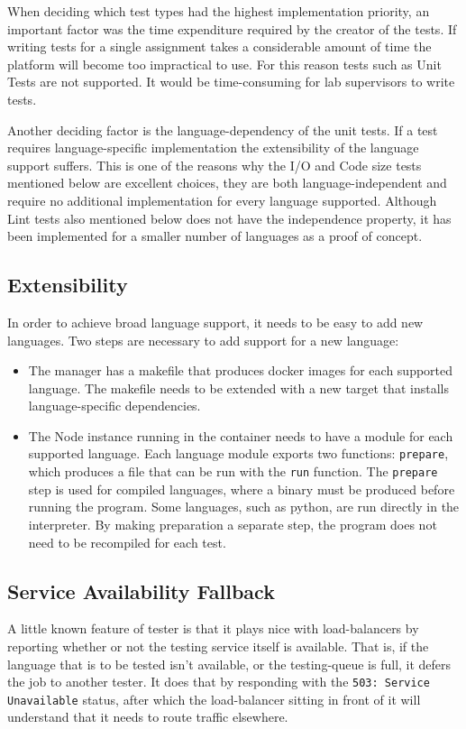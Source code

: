 When deciding which test types had the highest implementation priority, an important factor was the time expenditure required by the creator of the tests. If writing tests for a single assignment takes a considerable amount of time the platform will become too impractical to use. For this reason tests such as Unit Tests are not supported. It would be time-consuming for lab supervisors to write tests. %

Another deciding factor is the language-dependency of the unit tests. If a test requires language-specific implementation the extensibility of the language support suffers. This is one of the reasons why the I/O and Code size tests mentioned below are excellent choices, they are both language-independent and require no additional implementation for every language supported. Although Lint tests also mentioned below does not have the independence property, it has been implemented for a smaller number of languages as a proof of concept.

\subsection{Extensibility}
In order to achieve broad language support, it needs to be easy to add new languages. Two steps are necessary to add support for a new language:

\begin{itemize}
\item The manager has a makefile that produces docker images for each supported language. The makefile needs to be extended with a new target that installs language-specific dependencies.

\item The Node instance running in the container needs to have a module for each supported language. Each language module exports two functions: \texttt{prepare}, which produces a file that can be run with the \texttt{run} function. The \texttt{prepare} step is used for compiled languages, where a binary must be produced before running the program. Some languages, such as python, are run directly in the interpreter. By making preparation a separate step, the program does not need to be recompiled for each test.
\end{itemize}

\subsection{Service Availability Fallback}
A little known feature of tester is that it plays nice with load-balancers by reporting whether or not the testing service itself is available. That is, if the language that is to be tested isn't available, or the testing-queue is full, it defers the job to another tester. It does that by responding with the \texttt{503: Service Unavailable} status, after which the load-balancer sitting in front of it will understand that it needs to route traffic elsewhere.

